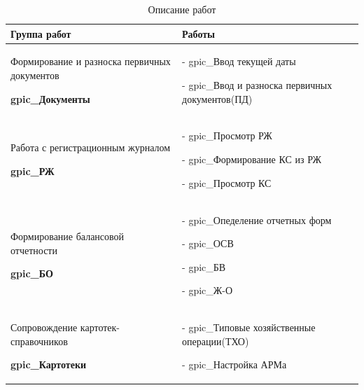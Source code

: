 \begin{table}[h!p]
    \centering
    \scriptsize
    \caption{Описание работ}
    \begin{tabular}{|p{8cm}|p{8cm}|} 


\hline


\textbf{Группа работ}
&
\textbf{Работы}
\\ \hline


Формирование и разноска первичных документов \par
\hspace{0pt} \par
\textbf{gpic\_Документы}
&
- gpic\_Ввод текущей даты \par
- gpic\_Ввод и разноска первичных документов(ПД)
\\ \hline


Работа с регистрационным журналом \par
\hspace{0pt} \par
\textbf{gpic\_РЖ}
&
- gpic\_Просмотр РЖ \par
- gpic\_Формирование КС из РЖ \par
- gpic\_Просмотр КС
\\ \hline


Формирование балансовой отчетности \par
\hspace{0pt} \par
\textbf{gpic\_БО}
&
- gpic\_Опеделение отчетных форм \par
- gpic\_ОСВ \par
- gpic\_БВ \par
- gpic\_Ж-О
\\ \hline


Сопровождение картотек-справочников \par
\hspace{0pt} \par
\textbf{gpic\_Картотеки}
&
- gpic\_Типовые хозяйственные операции(ТХО) \par
- gpic\_Настройка АРМа
\\ \hline



\end{tabular}
\end{table}
